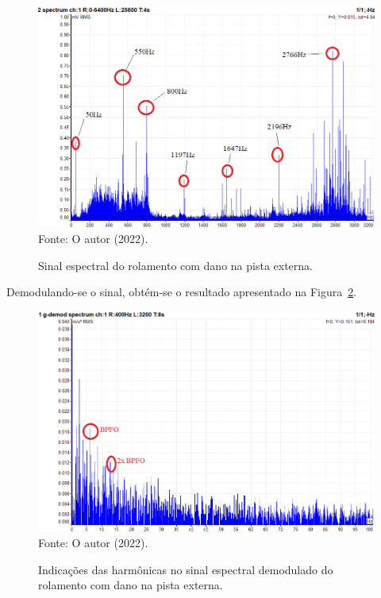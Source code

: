 \documentclass[
	12pt,				
	oneside,			
	a4paper,			
	english,			
	brazil,			
	]{abntex2ppgsi}
\begin{document}
\begin{figure}[H]
\centering
\caption {Sinal espectral do rolamento com dano na pista externa.}
\includegraphics[width=\textwidth,keepaspectratio]{espectro_rolamento_dano_pista_externa_mc4v_mv} \\
Fonte: O autor (2022).
\label{ESPECTRO_DEFEITO_EXTERNA_100HZ}
\end{figure}
  
Demodulando-se o sinal, obtém-se o resultado apresentado na Figura~\ref{PISTA_EXTERNA_DEMODULADA_anotada}.
 
\begin{figure}[H]
\centering
\caption {Indicações das harmônicas no sinal espectral demodulado do rolamento com dano na pista externa.}
\includegraphics[width=\textwidth,keepaspectratio]{PISTA_EXTERNA_DEMODULADA_anotada} \\
Fonte: O autor (2022).
\label{PISTA_EXTERNA_DEMODULADA_anotada}
\end{figure} 
\end{document}
